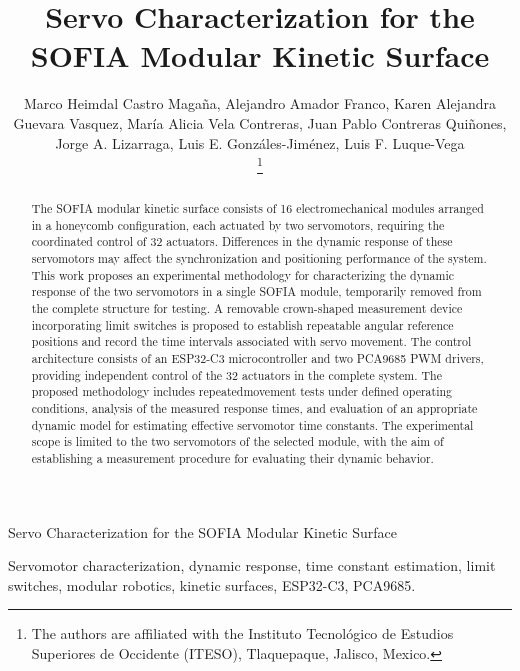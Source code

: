\documentclass[lettersize,journal]{IEEEtran}
\begin{document}
	
	\title{Servo Characterization for the SOFIA Modular Kinetic
		Surface}
	
	\author{
		Marco Heimdal Castro Magaña, Alejandro Amador Franco, Karen Alejandra Guevara Vasquez, María Alicia Vela Contreras, Juan Pablo Contreras Quiñones,
		Jorge A. Lizarraga, Luis E. Gonzáles-Jiménez, Luis F. Luque-Vega
		
	\thanks{The authors are affiliated with the Instituto Tecnológico de Estudios Superiores de Occidente (ITESO), Tlaquepaque, Jalisco, Mexico.}
	}
	
	
	{Servo Characterization for the SOFIA Modular Kinetic
		Surface}
	
	\maketitle
	
	
	\begin{abstract}
		The SOFIA modular kinetic surface consists of 16 electromechanical modules arranged in a honeycomb configuration, each actuated by two servomotors, requiring the coordinated control of 32 actuators. Differences in the dynamic response of these servomotors may affect the synchronization and positioning performance of the system. This work proposes an experimental methodology for characterizing the dynamic response of the two servomotors in a single SOFIA module, temporarily removed from the complete structure for testing. A removable crown-shaped measurement device incorporating limit switches is proposed to establish repeatable angular reference positions and record the time intervals associated with servo movement. The control architecture consists of an ESP32-C3 microcontroller and two PCA9685 PWM drivers, providing independent control of the 32 actuators in the complete system. The proposed methodology includes repeatedmovement tests under defined operating conditions, analysis of the measured response times, and evaluation of an appropriate dynamic model for
		estimating effective servomotor time constants. The experimental scope is limited to the two servomotors of the selected module, with the aim of establishing a measurement procedure for evaluating their dynamic behavior.
	\end{abstract}
	
	\begin{IEEEkeywords}
		Servomotor characterization, dynamic response, time constant estimation, limit switches, modular robotics, kinetic surfaces, ESP32-C3, PCA9685.
	\end{IEEEkeywords}
	
\end{document}
